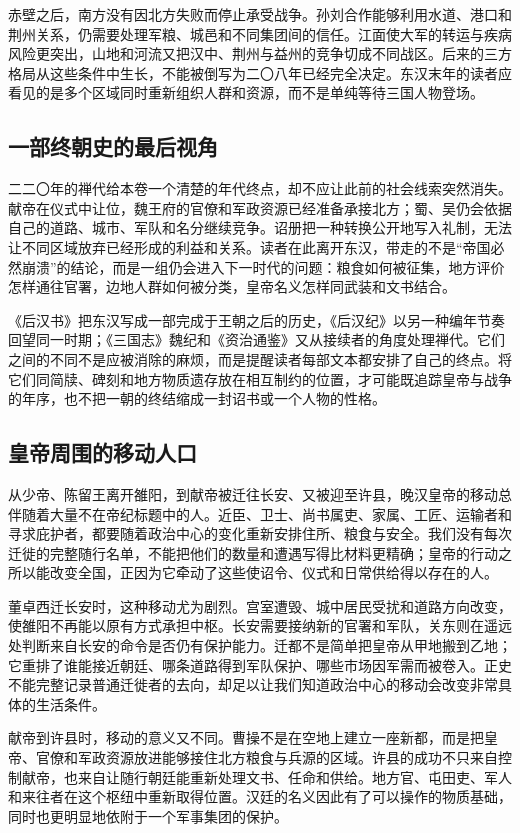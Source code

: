 赤壁之后，南方没有因北方失败而停止承受战争。孙刘合作能够利用水道、港口和荆州关系，仍需要处理军粮、城邑和不同集团间的信任。江面使大军的转运与疾病风险更突出，山地和河流又把汉中、荆州与益州的竞争切成不同战区。后来的三方格局从这些条件中生长，不能被倒写为二〇八年已经完全决定。东汉末年的读者应看见的是多个区域同时重新组织人群和资源，而不是单纯等待三国人物登场。

\subsection{一部终朝史的最后视角}

二二〇年的禅代给本卷一个清楚的年代终点，却不应让此前的社会线索突然消失。献帝在仪式中让位，魏王府的官僚和军政资源已经准备承接北方；蜀、吴仍会依据自己的道路、城市、军队和名分继续竞争。诏册把一种转换公开地写入礼制，无法让不同区域放弃已经形成的利益和关系。读者在此离开东汉，带走的不是“帝国必然崩溃”的结论，而是一组仍会进入下一时代的问题：粮食如何被征集，地方评价怎样通往官署，边地人群如何被分类，皇帝名义怎样同武装和文书结合。

《后汉书》把东汉写成一部完成于王朝之后的历史，《后汉纪》以另一种编年节奏回望同一时期；《三国志》魏纪和《资治通鉴》又从接续者的角度处理禅代。它们之间的不同不是应被消除的麻烦，而是提醒读者每部文本都安排了自己的终点。将它们同简牍、碑刻和地方物质遗存放在相互制约的位置，才可能既追踪皇帝与战争的年序，也不把一朝的终结缩成一封诏书或一个人物的性格。

\subsection{皇帝周围的移动人口}

从少帝、陈留王离开雒阳，到献帝被迁往长安、又被迎至许县，晚汉皇帝的移动总伴随着大量不在帝纪标题中的人。近臣、卫士、尚书属吏、家属、工匠、运输者和寻求庇护者，都要随着政治中心的变化重新安排住所、粮食与安全。我们没有每次迁徙的完整随行名单，不能把他们的数量和遭遇写得比材料更精确；皇帝的行动之所以能改变全国，正因为它牵动了这些使诏令、仪式和日常供给得以存在的人。

董卓西迁长安时，这种移动尤为剧烈。宫室遭毁、城中居民受扰和道路方向改变，使雒阳不再能以原有方式承担中枢。长安需要接纳新的官署和军队，关东则在遥远处判断来自长安的命令是否仍有保护能力。迁都不是简单把皇帝从甲地搬到乙地；它重排了谁能接近朝廷、哪条道路得到军队保护、哪些市场因军需而被卷入。正史不能完整记录普通迁徙者的去向，却足以让我们知道政治中心的移动会改变非常具体的生活条件。

献帝到许县时，移动的意义又不同。曹操不是在空地上建立一座新都，而是把皇帝、官僚和军政资源放进能够接住北方粮食与兵源的区域。许县的成功不只来自控制献帝，也来自让随行朝廷能重新处理文书、任命和供给。地方官、屯田吏、军人和来往者在这个枢纽中重新取得位置。汉廷的名义因此有了可以操作的物质基础，同时也更明显地依附于一个军事集团的保护。

